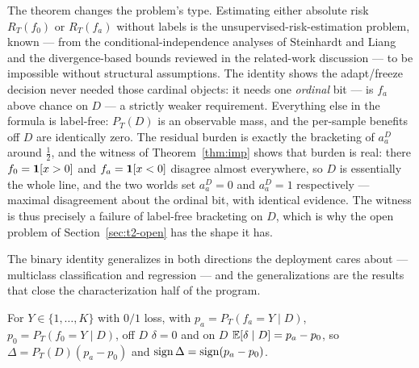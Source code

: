 \begin{remark}
\label{sec:t2-rem-ordinal}
The theorem changes the problem's type. Estimating either absolute risk $R_T(f_0)$ or
$R_T(f_a)$ without labels is the unsupervised-risk-estimation problem, known --- from
the conditional-independence analyses of Steinhardt and Liang and the divergence-based
bounds reviewed in the related-work discussion --- to be impossible without structural
assumptions.
The identity shows the adapt/freeze decision never needed those cardinal objects: it
needs one \emph{ordinal} bit --- is $f_a$ above chance on $D$ --- a strictly weaker
requirement. Everything else in the formula is label-free: $P_T(D)$ is an observable
mass, and the per-sample benefits off $D$ are identically zero. The residual burden is
exactly the bracketing of $a_a^D$ around $\tfrac12$, and the witness of
Theorem~\ref{thm:imp} shows that burden is real: there $f_0=\mathbf{1}[x>0]$ and
$f_a=\mathbf{1}[x<0]$ disagree almost everywhere, so $D$ is essentially the whole line, and
the two worlds set $a_a^D=0$ and $a_a^D=1$ respectively --- maximal disagreement about
the ordinal bit, with identical evidence. The witness is thus precisely a failure of
label-free bracketing on $D$, which is why the open problem of
Section~\ref{sec:t2-open} has the shape it has.
\end{remark}

The binary identity generalizes in both directions the deployment cares about ---
multiclass classification and regression --- and the generalizations are the results
that close the characterization half of the program.

\begin{theorem}
\label{thm:disagree-mc}
For $Y\in\{1,\dots,K\}$ with $0/1$ loss, with $p_a=P_T(f_a{=}Y\mid D)$,
$p_0=P_T(f_0{=}Y\mid D)$, off $D$ $\delta=0$ and on $D$ $\mathbb{E}[\delta\mid D]=p_a-p_0$, so
$\Delta=P_T(D)(p_a-p_0)$ and $\operatorname{sign}\Delta=\operatorname{sign}(p_a-p_0)$.
\end{theorem}


